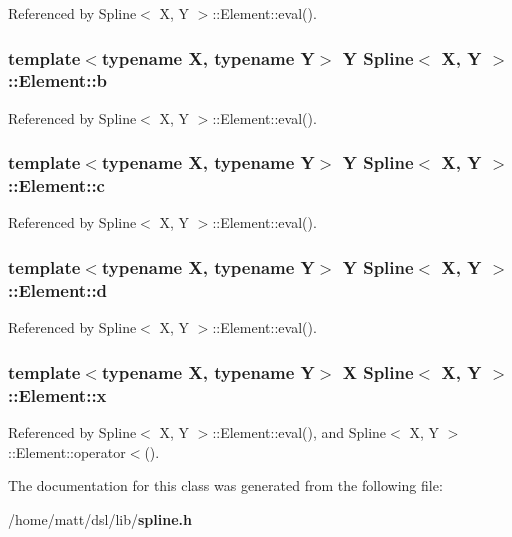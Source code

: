 \-Referenced by \-Spline$<$ X, Y $>$\-::\-Element\-::eval().

\subsubsection[{b}]{\setlength{\rightskip}{0pt plus 5cm}template$<$typename \-X, typename \-Y$>$ \-Y {\bf \-Spline}$<$ \-X, \-Y $>$\-::{\bf \-Element\-::b}}\label{classSpline_1_1Element_af109f201661f37626a794b1e3a55510a}


\-Referenced by \-Spline$<$ X, Y $>$\-::\-Element\-::eval().

\subsubsection[{c}]{\setlength{\rightskip}{0pt plus 5cm}template$<$typename \-X, typename \-Y$>$ \-Y {\bf \-Spline}$<$ \-X, \-Y $>$\-::{\bf \-Element\-::c}}\label{classSpline_1_1Element_ac07e9001f265749c4911309db45fd683}


\-Referenced by \-Spline$<$ X, Y $>$\-::\-Element\-::eval().

\subsubsection[{d}]{\setlength{\rightskip}{0pt plus 5cm}template$<$typename \-X, typename \-Y$>$ \-Y {\bf \-Spline}$<$ \-X, \-Y $>$\-::{\bf \-Element\-::d}}\label{classSpline_1_1Element_aea979df0cc618ad6b04c4aef4d8bcbb0}


\-Referenced by \-Spline$<$ X, Y $>$\-::\-Element\-::eval().

\subsubsection[{x}]{\setlength{\rightskip}{0pt plus 5cm}template$<$typename \-X, typename \-Y$>$ \-X {\bf \-Spline}$<$ \-X, \-Y $>$\-::{\bf \-Element\-::x}}\label{classSpline_1_1Element_a25cad79ff1314448e9af26e9842d72b8}


\-Referenced by \-Spline$<$ X, Y $>$\-::\-Element\-::eval(), and \-Spline$<$ X, Y $>$\-::\-Element\-::operator$<$().



\-The documentation for this class was generated from the following file\-:\begin{DoxyCompactItemize}
\item 
/home/matt/dsl/lib/{\bf spline.\-h}\end{DoxyCompactItemize}
